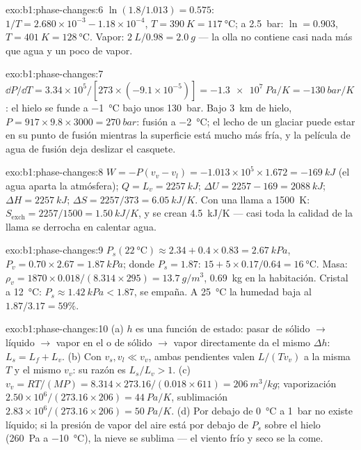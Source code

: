 \begin{solution}{exo:b1:phase-changes:6}
$\ln(1.8/1.013) = 0.575$: $1/T = 2.680 \times 10^{-3} - 1.18 \times 10^{-4}$,
$T = \qty{390}{K} = \qty{117}{\degreeCelsius}$; a \qty{2.5}{bar}: $\ln = 0.903$,
$T = \qty{401}{K} = \qty{128}{\degreeCelsius}$. Vapor: $\qty{2}{L}/0.98 =
\qty{2.0}{g}$ --- la olla no contiene casi nada más que agua y un poco de
vapor.
\end{solution}

\begin{solution}{exo:b1:phase-changes:7}
$\dd P/\dd T = 3.34 \times 10^5/[273 \times (-9.1 \times 10^{-5})] = \qty{-1.3e7}{Pa/K}
= \qty{-130}{bar/K}$: el hielo se funde a \qty{-1}{\degreeCelsius} bajo unos
\qty{130}{bar}. Bajo \qty{3}{km} de hielo, $P = 917 \times 9.8 \times 3000 =
\qty{270}{bar}$: fusión a \qty{-2}{\degreeCelsius}; el lecho de un glaciar
puede estar en su punto de fusión mientras la superficie está mucho más
fría, y la película de agua de fusión deja deslizar el casquete.
\end{solution}

\begin{solution}{exo:b1:phase-changes:8}
$W = -P(v_v - v_l) = -1.013 \times 10^5 \times 1.672 = \qty{-169}{kJ}$ (el agua
aparta la atmósfera); $Q = L_v = \qty{2257}{kJ}$; $\Delta U = 2257 - 169
= \qty{2088}{kJ}$; $\Delta H = \qty{2257}{kJ}$; $\Delta S = 2257/373 = \qty{6.05}{kJ/K}$.
Con una llama a \qty{1500}{K}: $S_{\mathrm{exch}} = 2257/1500 = \qty{1.50}{kJ/K}$,
y se crean \qty{4.5}{kJ/K} --- casi toda la calidad de la llama se
derrocha en calentar agua.
\end{solution}

\begin{solution}{exo:b1:phase-changes:9}
$P_s(\qty{22}{\degreeCelsius}) \approx 2.34 + 0.4 \times 0.83 = \qty{2.67}{kPa}$,
$P_v = 0.70 \times 2.67 = \qty{1.87}{kPa}$;  donde $P_s = 1.87$: $15 +
5 \times 0.17/0.64 = \qty{16}{\degreeCelsius}$. Masa: $\rho_v = 1870 \times 0.018/
(8.314 \times 295) = \qty{13.7}{g/m^3}$, \qty{0.69}{kg} en la habitación. Cristal a
\qty{12}{\degreeCelsius}: $P_s \approx \qty{1.42}{kPa} < 1.87$, se empaña. A
\qty{25}{\degreeCelsius} la humedad baja al $1.87/3.17 = 59\%$.
\end{solution}

\begin{solution}{exo:b1:phase-changes:10}
(a) $h$ es una función de estado: pasar de sólido $\to$ líquido $\to$ vapor en el
 o de sólido $\to$ vapor directamente da el mismo $\Delta h$:
$L_s = L_f + L_v$. (b) Con $v_s, v_l \ll v_v$, ambas pendientes valen $L/(Tv_v)$ a
la misma $T$ y el mismo $v_v$: su razón es $L_s/L_v > 1$. (c) $v_v = RT/(MP) =
8.314 \times 273.16/(0.018 \times 611) = \qty{206}{m^3/kg}$; vaporización
$2.50 \times 10^6/(273.16 \times 206) = \qty{44}{Pa/K}$, sublimación $2.83 \times 10^6/
(273.16 \times 206) = \qty{50}{Pa/K}$. (d) Por debajo de \qty{0}{\degreeCelsius} a
\qty{1}{bar} no existe líquido; si la presión de vapor del aire está por
debajo de $P_s$ sobre el hielo (\qty{260}{Pa} a \qty{-10}{\degreeCelsius}), la
nieve se sublima --- el viento frío y seco se la come.
\end{solution}

